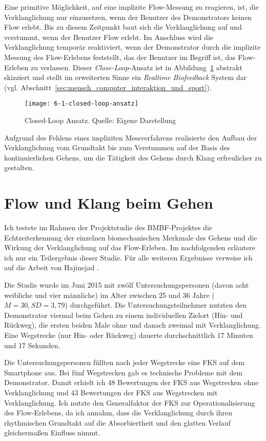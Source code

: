 Eine primitive Möglichkeit, auf eine implizite Flow-Messung zu reagieren, ist, die Verklanglichung nur einzusetzen, wenn der Benutzer des Demonstrators keinen Flow erlebt. Bis zu diesem Zeitpunkt baut sich die Verklanglichung auf und verstummt, wenn der Benutzer Flow erlebt. Im Anschluss wird die Verklanglichung temporär reaktiviert, wenn der Demonstrator durch die implizite Messung des Flow-Erlebens feststellt, das der Benutzer im Begriff ist, das Flow-Erleben zu verlassen. Dieser \emph{Close-Loop}-Ansatz ist in Abbildung~\ref{fig:6_1_closed_loop_ansatz} abstrakt skizziert \citep[vgl.][S.~474]{Calvo2015} und stellt im erweiterten Sinne ein \emph{Realtime Biofeedback} System dar (vgl. Abschnitt~\ref{sec:mensch_computer_interaktion_und_sport}). 

\begin{figure}[t]
	\centering
		\texttt{[image: 6-1-closed-loop-ansatz]}
	\caption[Closed-Loop Ansatz]{Closed-Loop Ansatz. Quelle: Eigene Darstellung}
	\label{fig:6_1_closed_loop_ansatz}
\end{figure}

Aufgrund des Fehlens eines impliziten Messverfahrens realisierte \citet{Hajinejad} den Aufbau der Verklanglichung vom Grundtakt bis zum Verstummen auf der Basis des kontinuierlichen Gehens, um die Tätigkeit des Gehens durch Klang erfreulicher zu gestalten.

\section{Flow und Klang beim Gehen}
Ich testete im Rahmen der Projektstudie des \acs{BMBF}-Projektes die Echtzeiterkennung der einzelnen biomechanischen Merkmale des Gehens und die Wirkung der Verklanglichung auf das Flow-Erleben. Im nachfolgenden erläutere ich nur ein Teilergebnis dieser Studie. Für alle weiteren Ergebnisse verweise ich auf die Arbeit von Hajinejad \citet{Hajinejad}. 

Die Studie wurde im Juni 2015 mit zwölf Untersuchungspersonen (davon acht weibliche und vier männliche) im Alter zwischen 25 und 36 Jahre ($M = 30, SD = 3,79$) durchgeführt. Die Untersuchungsteilnehmer nutzten den Demonstrator viermal beim Gehen zu einem individuellen Zielort (Hin- und Rückweg), die ersten beiden Male ohne und danach zweimal mit Verklanglichung. Eine Wegstrecke (nur Hin- oder Rückweg) dauerte durchschnittlich 17 Minuten und 17 Sekunden. 

Die Untersuchungspersonen füllten nach jeder Wegstrecke eine \ac{FKS} auf dem Smartphone aus. Bei fünf Wegstrecken gab es technische Probleme mit dem Demonstrator. Damit erhielt ich 48 Bewertungen der \ac{FKS} aus Wegstrecken ohne Verklanglichung und 43 Bewertungen der \ac{FKS} aus Wegstrecken mit Verklanglichung. Ich nutzte den Generalfaktor der \ac{FKS} zur Operationalisierung des Flow-Erlebens, da ich annahm, dass die Verklanglichung durch ihren rhythmischen Grundtakt auf die Absorbiertheit und den glatten Verlauf gleichermaßen Einfluss nimmt.

